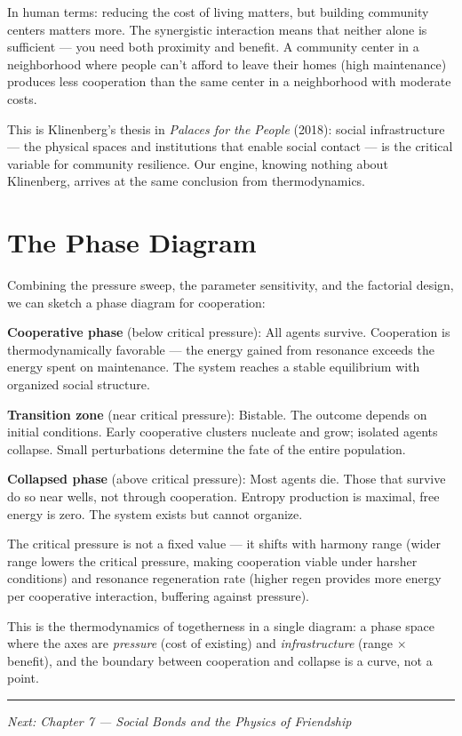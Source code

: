 In human terms: reducing the cost of living matters, but building community centers matters more. The synergistic interaction means that neither alone is sufficient --- you need both proximity and benefit. A community center in a neighborhood where people can't afford to leave their homes (high maintenance) produces less cooperation than the same center in a neighborhood with moderate costs.

This is Klinenberg's thesis in \emph{Palaces for the People} (2018): social infrastructure --- the physical spaces and institutions that enable social contact --- is the critical variable for community resilience. Our engine, knowing nothing about Klinenberg, arrives at the same conclusion from thermodynamics.

\section{The Phase Diagram}\label{the-phase-diagram}

Combining the pressure sweep, the parameter sensitivity, and the factorial design, we can sketch a phase diagram for cooperation:

\textbf{Cooperative phase} (below critical pressure): All agents survive. Cooperation is thermodynamically favorable --- the energy gained from resonance exceeds the energy spent on maintenance. The system reaches a stable equilibrium with organized social structure.

\textbf{Transition zone} (near critical pressure): Bistable. The outcome depends on initial conditions. Early cooperative clusters nucleate and grow; isolated agents collapse. Small perturbations determine the fate of the entire population.

\textbf{Collapsed phase} (above critical pressure): Most agents die. Those that survive do so near wells, not through cooperation. Entropy production is maximal, free energy is zero. The system exists but cannot organize.

The critical pressure is not a fixed value --- it shifts with harmony range (wider range lowers the critical pressure, making cooperation viable under harsher conditions) and resonance regeneration rate (higher regen provides more energy per cooperative interaction, buffering against pressure).

This is the thermodynamics of togetherness in a single diagram: a phase space where the axes are \emph{pressure} (cost of existing) and \emph{infrastructure} (range $\times$ benefit), and the boundary between cooperation and collapse is a curve, not a point.

\begin{center}\rule{0.5\linewidth}{0.5pt}\end{center}

\emph{Next: Chapter 7 --- Social Bonds and the Physics of Friendship}
